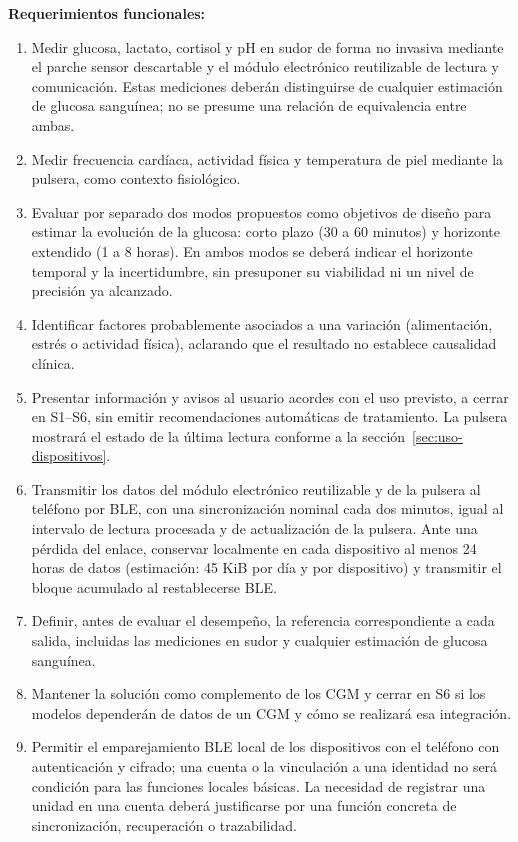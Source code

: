 \noindent\textbf{Requerimientos funcionales:}
\begin{enumerate}
    \item Medir glucosa, lactato, cortisol y pH en sudor de forma no invasiva mediante el parche sensor descartable y el módulo electrónico reutilizable de lectura y comunicación. Estas mediciones deberán distinguirse de cualquier estimación de glucosa sanguínea; no se presume una relación de equivalencia entre ambas.
    \item Medir frecuencia cardíaca, actividad física y temperatura de piel mediante la pulsera, como contexto fisiológico.
    \item Evaluar por separado dos modos propuestos como objetivos de diseño para estimar la evolución de la glucosa: corto plazo (30 a 60 minutos) y horizonte extendido (1 a 8 horas). En ambos modos se deberá indicar el horizonte temporal y la incertidumbre, sin presuponer su viabilidad ni un nivel de precisión ya alcanzado.
    \item Identificar factores probablemente asociados a una variación (alimentación, estrés o actividad física), aclarando que el resultado no establece causalidad clínica.
    \item Presentar información y avisos al usuario acordes con el uso previsto, a cerrar en S1--S6, sin emitir recomendaciones automáticas de tratamiento. La pulsera mostrará el estado de la última lectura conforme a la sección~\ref{sec:uso-dispositivos}.
    \item Transmitir los datos del módulo electrónico reutilizable y de la pulsera al teléfono por BLE, con una sincronización nominal cada dos minutos, igual al intervalo de lectura procesada y de actualización de la pulsera. Ante una pérdida del enlace, conservar localmente en cada dispositivo al menos 24 horas de datos (estimación: 45 KiB por día y por dispositivo) y transmitir el bloque acumulado al restablecerse BLE.
    \item Definir, antes de evaluar el desempeño, la referencia correspondiente a cada salida, incluidas las mediciones en sudor y cualquier estimación de glucosa sanguínea.
    \item Mantener la solución como complemento de los CGM y cerrar en S6 si los modelos dependerán de datos de un CGM y cómo se realizará esa integración.
    \item Permitir el emparejamiento BLE local de los dispositivos con el teléfono con autenticación y cifrado; una cuenta o la vinculación a una identidad no será condición para las funciones locales básicas. La necesidad de registrar una unidad en una cuenta deberá justificarse por una función concreta de sincronización, recuperación o trazabilidad.

\end{enumerate}
